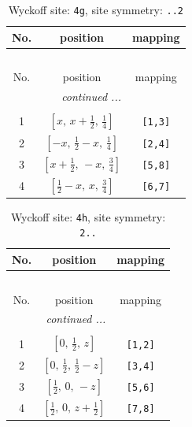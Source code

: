 \documentclass[fleqn,8pt]{jsarticle}
\begin{document}
\renewcommand{\arraystretch}{1.2}
\begin{longtable}{ccc}
\caption{Wyckoff site: {\tt 4g}, site symmetry: {\tt ..2}}
 \\
 \hline \hline
No. & position & mapping \\ \hline \endfirsthead

\multicolumn{2}{l}{\tablename\ \thetable{}} \\
 \hline \hline
No. & position & mapping \\ \hline \endhead

 \hline \hline
\multicolumn{2}{r}{\footnotesize\it continued ...} \\ \endfoot

 \hline \hline
\multicolumn{2}{r}{} \\ \endlastfoot

1 & $\left[ x,\, x + \frac{1}{2},\, \frac{1}{4} \right]$ & {\tt [1,3]} \\ \hline
2 & $\left[ - x,\, \frac{1}{2} - x,\, \frac{1}{4} \right]$ & {\tt [2,4]} \\ \hline
3 & $\left[ x + \frac{1}{2},\, - x,\, \frac{3}{4} \right]$ & {\tt [5,8]} \\ \hline
4 & $\left[ \frac{1}{2} - x,\, x,\, \frac{3}{4} \right]$ & {\tt [6,7]} \\
\end{longtable}
\renewcommand{\arraystretch}{1.2}
\begin{longtable}{ccc}
\caption{Wyckoff site: {\tt 4h}, site symmetry: {\tt 2..}}
 \\
 \hline \hline
No. & position & mapping \\ \hline \endfirsthead

\multicolumn{2}{l}{\tablename\ \thetable{}} \\
 \hline \hline
No. & position & mapping \\ \hline \endhead

 \hline \hline
\multicolumn{2}{r}{\footnotesize\it continued ...} \\ \endfoot

 \hline \hline
\multicolumn{2}{r}{} \\ \endlastfoot

1 & $\left[ 0,\, \frac{1}{2},\, z \right]$ & {\tt [1,2]} \\ \hline
2 & $\left[ 0,\, \frac{1}{2},\, \frac{1}{2} - z \right]$ & {\tt [3,4]} \\ \hline
3 & $\left[ \frac{1}{2},\, 0,\, - z \right]$ & {\tt [5,6]} \\ \hline
4 & $\left[ \frac{1}{2},\, 0,\, z + \frac{1}{2} \right]$ & {\tt [7,8]} \\
\end{longtable}
\end{document}
